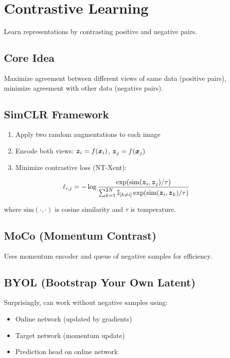 
\section{Contrastive Learning }
\label{sec:contrastive-learning}

Learn representations by contrasting positive and negative pairs.

\subsection{Core Idea}

Maximize agreement between different views of same data (positive pairs), minimize agreement with other data (negative pairs).

\subsection{SimCLR Framework}

\begin{enumerate}
    \item Apply two random augmentations to each image
    \item Encode both views: $\boldsymbol{z}_i = f(\boldsymbol{x}_i)$, $\boldsymbol{z}_j = f(\boldsymbol{x}_j)$
    \item Minimize contrastive loss (NT-Xent):
\end{enumerate}

\begin{equation}
\ell_{i,j} = -\log \frac{\exp(\text{sim}(\boldsymbol{z}_i, \boldsymbol{z}_j)/\tau)}{\sum_{k=1}^{2N} \mathbb{I}_{[k \neq i]} \exp(\text{sim}(\boldsymbol{z}_i, \boldsymbol{z}_k)/\tau)}
\end{equation}

where $\text{sim}(\cdot, \cdot)$ is cosine similarity and $\tau$ is temperature.

\subsection{MoCo (Momentum Contrast)}

Uses momentum encoder and queue of negative samples for efficiency.

\subsection{BYOL (Bootstrap Your Own Latent)}

Surprisingly, can work without negative samples using:
\begin{itemize}
    \item Online network (updated by gradients)
    \item Target network (momentum update)
    \item Prediction head on online network
\end{itemize}

